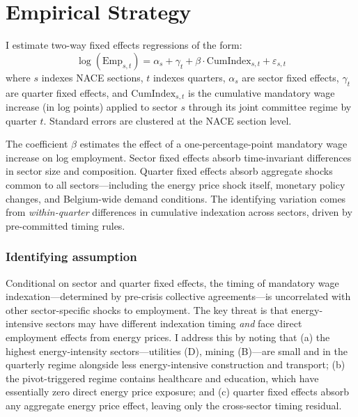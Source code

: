 \documentclass[12pt]{article}
\begin{document}



\section{Empirical Strategy}

I estimate two-way fixed effects regressions of the form:
\begin{equation}
\log(\text{Emp}_{s,t}) = \alpha_s + \gamma_t + \beta \cdot \text{CumIndex}_{s,t} + \varepsilon_{s,t}
\label{eq:main}
\end{equation}
where $s$ indexes NACE sections, $t$ indexes quarters, $\alpha_s$ are sector fixed effects, $\gamma_t$ are quarter fixed effects, and $\text{CumIndex}_{s,t}$ is the cumulative mandatory wage increase (in log points) applied to sector $s$ through its joint committee regime by quarter $t$. Standard errors are clustered at the NACE section level.

The coefficient $\beta$ estimates the effect of a one-percentage-point mandatory wage increase on log employment. Sector fixed effects absorb time-invariant differences in sector size and composition. Quarter fixed effects absorb aggregate shocks common to all sectors---including the energy price shock itself, monetary policy changes, and Belgium-wide demand conditions. The identifying variation comes from \textit{within-quarter} differences in cumulative indexation across sectors, driven by pre-committed timing rules.

\subsubsection*{Identifying assumption} Conditional on sector and quarter fixed effects, the timing of mandatory wage indexation---determined by pre-crisis collective agreements---is uncorrelated with other sector-specific shocks to employment. The key threat is that energy-intensive sectors may have different indexation timing \textit{and} face direct employment effects from energy prices. I address this by noting that (a) the highest energy-intensity sectors---utilities (D), mining (B)---are small and in the quarterly regime alongside less energy-intensive construction and transport; (b) the pivot-triggered regime contains healthcare and education, which have essentially zero direct energy price exposure; and (c) quarter fixed effects absorb any aggregate energy price effect, leaving only the cross-sector timing residual.
\end{document}
